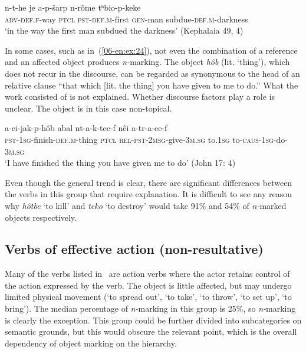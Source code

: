 \documentclass[output=paper]{LSP/langsci}
\begin{document}
\begin{exe}
\ex \label{06-en:ex:23}
\gll n-t-he 				je 		a-p-šarp 			n-rôme 	tʰbio-p-keke\\
	\textsc{adv-}\textsc{def.f-}way \textsc{ptcl} \textsc{pst-def.m-}first \textsc{gen-}man subdue-\textsc{def.m-}darkness\\
\glt ‘in the way the first man subdued the darkness’ (Kephalaia 49, 4)
\end{exe}

In some cases, such as in~(\ref{06-en:ex:24}), not even the combination of a  reference and an affected object produces \textit{n-}marking. The object \textit{hôb} (lit. ‘thing’), which does not recur in the discourse, can be regarded as synonymous to the head of an  relative clause “that which [lit. the thing] you have given to me to do.” What the work consisted of is not explained. Whether discourse factors play a role is unclear. The object is in this case non-topical.

\begin{exe}
\ex \label{06-en:ex:24}
\gll a-ei-jak-p-hôb 				abal  nt-a-k-tee-f 					nêi 		a-tr-a-ee-f\\
     \textsc{pst-}1\textsc{sg-}finish-\textsc{def.m-}thing \textsc{ptcl} \textsc{rel-pst-2msg-}give-\textsc{3m.sg} to.\textsc{1sg} to-\textsc{caus-}\textsc{1sg-}do\textsc{-3m.sg}\\
\glt ‘I have finished the thing you have given me to do’ (John 17: 4)
\end{exe}

Even though the general trend is clear, there are significant differences between the verbs in this group that require explanation. It is difficult to see any reason why \textit{hôtbe} ‘to kill’ and \textit{teko} ‘to destroy’ would take 91\% and 54\% of \textit{n-}marked objects respectively. 

\subsection{Verbs of effective action (non-resultative)}
\label{06-en-sec:5-2}

Many of the verbs listed in~ are action verbs where the actor retains control of the action expressed by the verb. The object is little affected, but may undergo limited physical movement (\eg ‘to spread out’, ‘to take’, ‘to throw’, ‘to set up’, ‘to bring’). The median percentage of \textit{n-}marking in this group is 25\%, so \textit{n-}marking is clearly the exception. This group could be further divided into subcategories on semantic grounds, but this would obscure the relevant point, which is the overall dependency of object marking on the  hierarchy. 
\end{document}
